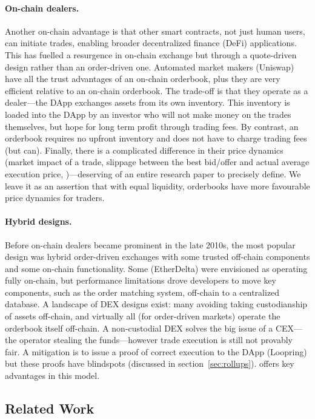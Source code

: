 \paragraph{On-chain dealers.} Another on-chain advantage is that other smart contracts, not just human users, can initiate trades, enabling broader decentralized finance (DeFi) applications. This has fuelled a resurgence in on-chain exchange but through a quote-driven design rather than an order-driven one. Automated market makers  (\eg Uniswap) have all the trust advantages of an on-chain orderbook, plus they are very efficient relative to an on-chain orderbook. The trade-off is that they operate as a dealer---the DApp exchanges assets from its own inventory. This inventory is loaded into the DApp by an investor who will not make money on the trades themselves, but hope for long term profit through trading fees. By contrast, an orderbook requires no upfront inventory and does not have to charge trading fees (but can). Finally, there is a complicated difference in their price dynamics (\eg market impact of a trade, slippage between the best bid/offer and actual average execution price, \etc)---deserving of an entire research paper to precisely define. We leave it as an assertion that with equal liquidity, orderbooks have more favourable price dynamics for traders.

\paragraph{Hybrid designs.} Before on-chain dealers became prominent in the late 2010s, the most popular design was hybrid order-driven exchanges with some trusted off-chain components and some on-chain functionality. Some (\eg EtherDelta) were envisioned as operating fully on-chain, but performance limitations drove developers to move key components, such as the order matching system, off-chain to a centralized database. A landscape of DEX designs exist: many avoiding taking custodianship of assets off-chain, and virtually all (for order-driven markets) operate the orderbook itself off-chain. A non-custodial DEX solves the big issue of a CEX---the operator stealing the funds---however trade execution is still not provably fair. A mitigation is to issue a proof of correct execution to the DApp (\eg Loopring) but these proofs have blindspots (discussed in section~\ref{sec:rollups}). \cm offers key advantages in this model. 



\subsection{Related Work}

